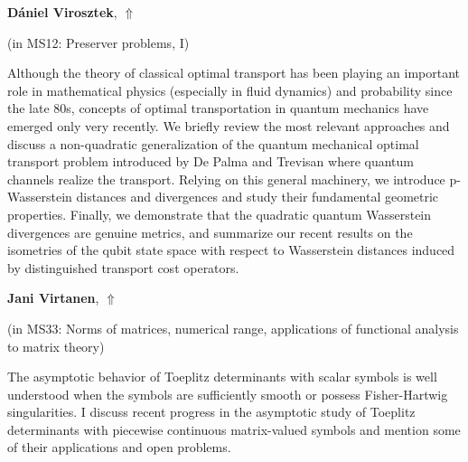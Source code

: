 \documentclass[ILAS2025-program.tex]{subfiles}
\begin{document}
\hypertarget{down0126}{}\begin{ilasabstract}
    
\textbf{Dániel Virosztek},  \hfill \hyperlink{up0126}{$\Uparrow$}
    
    
(in {\color{mstitle}MS12: Preserver problems, I})
        
\mtskip
    Although the theory of classical optimal transport has been playing an important role in mathematical physics (especially in fluid dynamics) and probability since the late 80s, concepts of optimal transportation in quantum mechanics have emerged only very recently. We briefly review the most relevant approaches and discuss a non-quadratic generalization of the quantum mechanical optimal transport problem introduced by De Palma and Trevisan where quantum channels realize the transport. Relying on this general machinery, we introduce p-Wasserstein distances and divergences and study their fundamental geometric properties. Finally, we demonstrate that the quadratic quantum Wasserstein divergences are genuine metrics, and summarize our recent results on the isometries of the qubit state space with respect to Wasserstein distances induced by distinguished transport cost operators.

\end{ilasabstract}
    

\hypertarget{down0246}{}\begin{ilasabstract}
    
\textbf{Jani Virtanen},  \hfill \hyperlink{up0246}{$\Uparrow$}
    
    
(in {\color{mstitle}MS33: Norms of matrices, numerical range, applications of functional analysis to matrix theory})
        
\mtskip
    The asymptotic behavior of Toeplitz determinants with scalar symbols is well understood when the symbols are sufficiently smooth or possess Fisher-Hartwig singularities. I discuss recent progress in the asymptotic study of Toeplitz determinants with piecewise continuous matrix-valued symbols and mention some of their applications and open problems.

\end{ilasabstract}
    
\end{document}
